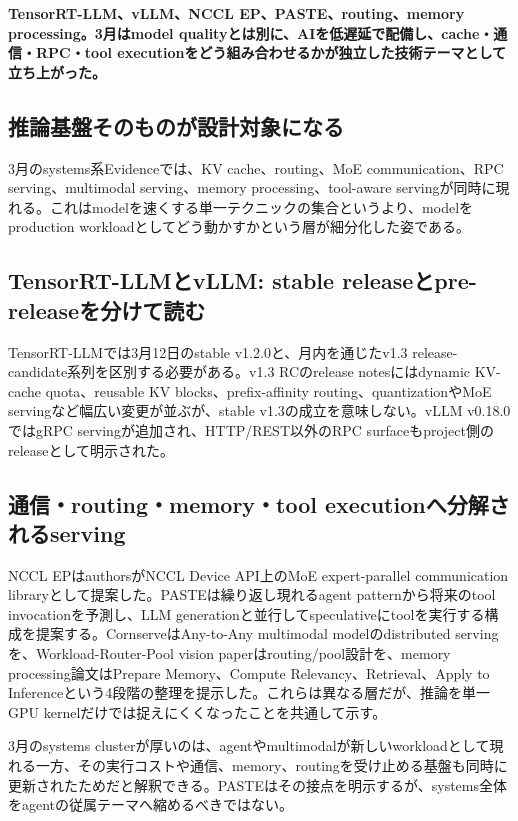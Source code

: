 \noindent\textbf{TensorRT-LLM、vLLM、NCCL EP、PASTE、routing、memory processing。3月はmodel qualityとは別に、AIを低遅延で配備し、cache・通信・RPC・tool executionをどう組み合わせるかが独立した技術テーマとして立ち上がった。}\autocite{src-3802d01433c1,src-446e2c561111,src-7e670bf82538,src-d6cda62f02bb,src-fc697f165940}

\subsection{推論基盤そのものが設計対象になる}

3月のsystems系Evidenceでは、KV cache、routing、MoE communication、RPC serving、multimodal serving、memory processing、tool-aware servingが同時に現れる。これはmodelを速くする単一テクニックの集合というより、modelをproduction workloadとしてどう動かすかという層が細分化した姿である。\autocite{src-361b6111931d,src-3802d01433c1,src-446e2c561111,src-795aff00bd48,src-7e670bf82538,src-b08e40540c2a,src-b6e517afaa35,src-d6cda62f02bb,src-fc697f165940}


\subsection{TensorRT-LLMとvLLM: stable releaseとpre-releaseを分けて読む}

TensorRT-LLMでは3月12日のstable v1.2.0と、月内を通じたv1.3 release-candidate系列を区別する必要がある。v1.3 RCのrelease notesにはdynamic KV-cache quota、reusable KV blocks、prefix-affinity routing、quantizationやMoE servingなど幅広い変更が並ぶが、stable v1.3の成立を意味しない。vLLM v0.18.0ではgRPC servingが追加され、HTTP/REST以外のRPC surfaceもproject側のreleaseとして明示された。\autocite{src-7e670bf82538,src-b08e40540c2a,src-d6cda62f02bb,src-fc697f165940}


\subsection{通信・routing・memory・tool executionへ分解されるserving}

NCCL EPはauthorsがNCCL Device API上のMoE expert-parallel communication libraryとして提案した。PASTEは繰り返し現れるagent patternから将来のtool invocationを予測し、LLM generationと並行してspeculativeにtoolを実行する構成を提案する。CornserveはAny-to-Any multimodal modelのdistributed servingを、Workload-Router-Pool vision paperはrouting/pool設計を、memory processing論文はPrepare Memory、Compute Relevancy、Retrieval、Apply to Inferenceという4段階の整理を提示した。これらは異なる層だが、推論を単一GPU kernelだけでは捉えにくくなったことを共通して示す。\autocite{src-361b6111931d,src-3802d01433c1,src-446e2c561111,src-795aff00bd48,src-b6e517afaa35}


3月のsystems clusterが厚いのは、agentやmultimodalが新しいworkloadとして現れる一方、その実行コストや通信、memory、routingを受け止める基盤も同時に更新されたためだと解釈できる。PASTEはその接点を明示するが、systems全体をagentの従属テーマへ縮めるべきではない。\autocite{src-361b6111931d,src-446e2c561111,src-d6cda62f02bb,src-fc697f165940}


